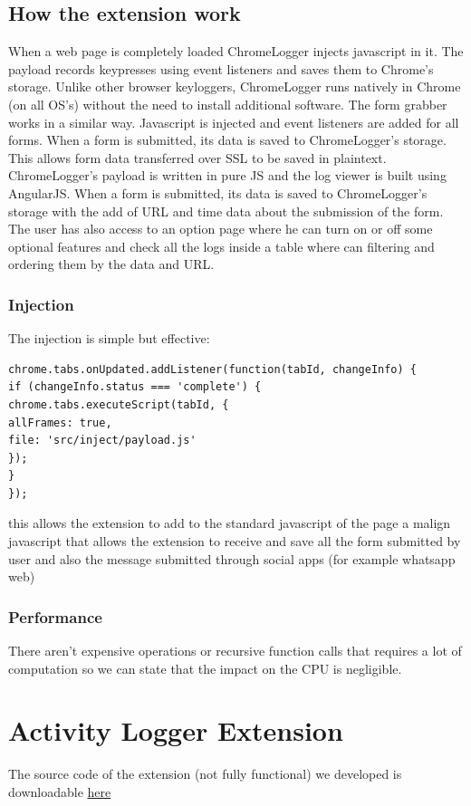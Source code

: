\documentclass[12pt]{article}
\begin{document}
\begin{multicols}{2}
\subsection*{How the extension work}
When a web page is completely loaded ChromeLogger injects javascript in it. The payload records keypresses using event listeners and saves them to Chrome's storage. Unlike other browser keyloggers, ChromeLogger runs natively in Chrome (on all OS's) without the need to install additional software.
The form grabber works in a similar way. Javascript is injected and event listeners are added for all forms. When a form is submitted, its data is saved to ChromeLogger's storage. This allows form data transferred over SSL to be saved in plaintext.
ChromeLogger's payload is written in pure JS and the log viewer is built using AngularJS. When a form is submitted, its data is saved to ChromeLogger's storage with the add of URL and time data about the submission of the form.
The user has also access to an option page where he can turn on or off some optional features and check all the logs inside a table where can filtering and ordering them by the data and URL.
\subsubsection*{Injection}
The injection is simple but effective:
\begin{lstlisting}
chrome.tabs.onUpdated.addListener(function(tabId, changeInfo) {
if (changeInfo.status === 'complete') {
chrome.tabs.executeScript(tabId, {
allFrames: true, 
file: 'src/inject/payload.js'
});
}
});
\end{lstlisting}
this allows the extension to add to the standard javascript of the page a malign javascript that allows the extension to receive and save all the form submitted by user and also the message submitted through social apps (for example whatsapp web)
\subsubsection*{Performance}
There aren't expensive operations or recursive function calls that requires a lot of computation so we can state that the impact on the CPU is negligible.
\section*{Activity Logger Extension}
The source code of the extension (not fully functional) we developed is downloadable \href{https://github.com/andreamultineddu/Activity-Logger}{here}

\end{multicols}
\end{document}
